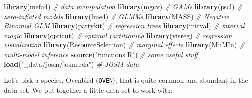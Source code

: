 \documentclass[12pt,]{book}
\newenvironment{Shaded}{\begin{snugshade}}{\end{snugshade}}
\newcommand{\CommentTok}[1]{\textcolor[rgb]{0.56,0.35,0.01}{\textit{#1}}}
\newcommand{\KeywordTok}[1]{\textcolor[rgb]{0.13,0.29,0.53}{\textbf{#1}}}
\newcommand{\NormalTok}[1]{#1}
\newcommand{\StringTok}[1]{\textcolor[rgb]{0.31,0.60,0.02}{#1}}
\begin{document}
\begin{Shaded}
\begin{Highlighting}[]
\KeywordTok{library}\NormalTok{(mefa4)                }\CommentTok{# data manipulation}
\KeywordTok{library}\NormalTok{(mgcv)                 }\CommentTok{# GAMs}
\KeywordTok{library}\NormalTok{(pscl)                 }\CommentTok{# zero-inflated models}
\KeywordTok{library}\NormalTok{(lme4)                 }\CommentTok{# GLMMs}
\KeywordTok{library}\NormalTok{(MASS)                 }\CommentTok{# Negative Binomial GLM}
\KeywordTok{library}\NormalTok{(partykit)             }\CommentTok{# regression trees}
\KeywordTok{library}\NormalTok{(intrval)              }\CommentTok{# interval magic}
\KeywordTok{library}\NormalTok{(opticut)              }\CommentTok{# optimal partitioning}
\KeywordTok{library}\NormalTok{(visreg)               }\CommentTok{# regression visualization}
\KeywordTok{library}\NormalTok{(ResourceSelection)    }\CommentTok{# marginal effects}
\KeywordTok{library}\NormalTok{(MuMIn)                }\CommentTok{# multi-model inference}
\KeywordTok{source}\NormalTok{(}\StringTok{"functions.R"}\NormalTok{)         }\CommentTok{# some useful stuff}
\KeywordTok{load}\NormalTok{(}\StringTok{"_data/josm/josm.rda"}\NormalTok{) }\CommentTok{# JOSM data}
\end{Highlighting}
\end{Shaded}

Let's pick a species, Ovenbird (\texttt{OVEN}), that is quite common and abundant in the data set.
We put together a little data set to work with:
\end{document}
